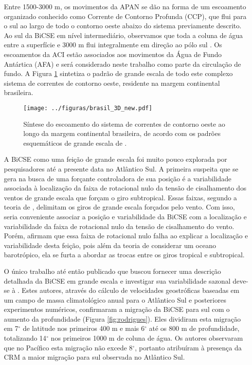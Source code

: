 Entre 1500-3000 m, os movimentos da APAN se dão na forma de um escoamento organizado conhecido 
como Corrente de Contorno Profunda (CCP), que flui para o sul ao largo de todo o contorno
oeste abaixo do sistema previamente descrito. Ao sul da BiCSE em nível intermediário, 
observamos que toda a coluna de água entre a superfície e 3000 m flui integralmente 
em direção ao pólo sul \citep{zemba1991,silveira_etal2000A}. Os escoamentos da ACI estão 
associados aos movimentos da Água de Fundo Antártica (AFA) e será considerado neste trabalho
como parte da circulação de fundo. A Figura \ref{fig:brasil_3D}
sintetiza o padrão de grande escala de todo este complexo sistema de correntes de 
contorno oeste, residente na margem continental brasileira.

\begin{figure}%
 \begin{center}
  \texttt{[image: ../figuras/brasil\_3D\_new.pdf]}
 \end{center}
 \vspace{-.5cm}
 \renewcommand{\baselinestretch}{1}
 \caption{\label{fig:brasil_3D} \small Síntese do escoamento do sistema de correntes 
de contorno oeste ao longo da margem continental brasileira, de acordo com os padrões esquemáticos de grande escala de \cite{stramma_england1999}.}
\end{figure}

A BiCSE como uma feição de grande escala foi muito pouco explorada por pesquisadores até a presente data no Atlântico Sul. A primeira 
suspeita que se gera na busca de uma forçante controladora de sua posição é a variabilidade associada à localização da faixa de 
rotacional nulo da tensão de cisalhamento dos ventos de grande escala que forçam o giro subtropical. Essas faixas, segundo a teoria de \cite{sverdrup1947},
delimitam os giros de grande escala forçados pelo vento. Com isso, seria conveniente associar a posição e 
variabilidade da BiCSE com a localização e variabilidade da faixa de rotacional nulo da tensão de cisalhamento do vento. 
Porém, \cite{qu_lukas2003} afirmam que essa faixa de rotacional nulo falha ao explicar a localização e variabilidade 
desta feição, pois além da teoria de \cite{sverdrup1947} considerar um oceano barotrópico, ela se furta a abordar as trocas entre
os giros tropical e subtropical. 

O único trabalho até então publicado que buscou fornecer uma descrição detalhada da 
BiCSE em grande escala e investigar sua variabilidade sazonal deve-se à \cite{rodrigues_etal2006}. Estes autores, através
do cálculo de velocidades geostróficas baseadas em um campo de massa climatológico anual para o Atlântico Sul e posteriores 
experimentos numéricos, confirmaram a migração da BiCSE para sul com o aumento da profundidade (Figura \ref{fig:rodrigues}). Eles dividiram esta migração 
em 7$^\circ$ de latitude nos primeiros 400 m e mais 6$^\circ$ até os 800 m de profundidade, totalizando 14$^\circ$ nos primeiros
1000 m de coluna de água. Os autores observaram que no Pacífico esta migração não excede 8$^\circ$, portanto atribuíram
à presença da CRM a maior migração para sul observada no Atlântico Sul. 

